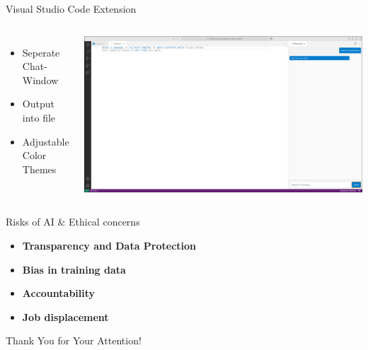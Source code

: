 \documentclass{beamer}
\begin{document}
\begin{frame}{Visual Studio Code Extension}
  \begin{columns}
      \begin{itemize}
        \item Seperate Chat-Window
        \item Output into file
        \item Adjustable Color Themes
      \end{itemize}
      \centering
      \includegraphics[width=\textwidth]{VSCodeExtension.png}
  \end{columns}
\end{frame}

\begin{frame}{Risks of AI \& Ethical concerns}
  \begin{itemize}
    \item \textbf{Transparency and Data Protection}
    \item \textbf{Bias in training data}
    \item \textbf{Accountability}
    \item \textbf{Job displacement}
  \end{itemize}
\end{frame}

\begin{frame}[plain]
  
  \centering
  \vspace{1cm}
  \Huge Thank You for Your Attention!
\end{frame}
\end{document}
